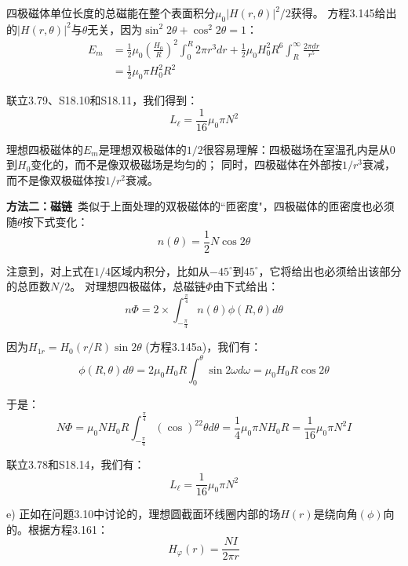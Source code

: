 四极磁体单位长度的总磁能在整个表面积分$\mu_0|H(r,\theta)|^2/2$获得。
方程3.145给出的$|H(r,\theta)|^2$与$\theta$无关，因为$\sin^2 2\theta+\cos^2 2\theta=1$：
\begin{align*}%
E_m&=\frac{1}{2}\mu_0(\frac{H_0}{R})^2\int_{0}^{R}2\pi r^3dr+\frac{1}{2}\mu_0H_{0}^{2}R^6\int_{R}^{\infty}\frac{2\pi dr}{r^5}\\
&=\frac{1}{2}\mu_0\pi H_{0}^{2}R^2\tag{S18.11}
\end{align*}

联立3.79、S18.10和S18.11，我们得到：
 \begin{equation*}%
L_\ell=\frac{1}{16}\mu_0\pi N^2 \tag{3.88}
\end{equation*}

理想四极磁体的$E_m$是理想双极磁体的$1/2$很容易理解：四极磁场在室温孔内是从$0$到$H_0$变化的，而不是像双极磁场是均匀的；
同时，四极磁体在外部按$1/r^3$衰减，而不是像双极磁体按$1/r^2$衰减。

\textbf{方法二：磁链}\ 类似于上面处理的双极磁体的``匝密度"，四极磁体的匝密度也必须随$\theta$按下式变化：
 \begin{equation*}%
n(\theta)=\frac{1}{2}N\cos 2\theta \tag{S18.12}
\end{equation*}

注意到，对上式在$1/4$区域内积分，比如从$-45^\circ$到$45^\circ$，它将给出也必须给出该部分的总匝数$N/2$。
对理想四极磁体，总磁链$\Phi$由下式给出：
\begin{equation*}%
n\Phi=2\times\int_{-\frac{\pi}{4}}^{\frac{\pi}{4}}n(\theta)\phi(R,\theta)d\theta \tag{S18.13b}
\end{equation*}

因为$H_{1r} = H_0(r/R) \sin 2\theta$ (方程3.145a)，我们有：
 \begin{equation*}%
\phi(R,\theta)d\theta=2\mu_0H_0R\int_{0}^{\theta}\sin 2\omega d\omega=\mu_0H_0R\cos 2\theta\tag{18.13b}
\end{equation*}

于是：
\begin{equation*}%
N\Phi=\mu_0NH_0R\int_{-\frac{\pi}{4}}^{\frac{\pi}{4}}(\cos)^22\theta d\theta
=\frac{1}{4}\mu_0\pi NH_0R=\frac{1}{16}\mu_0\pi N^2I \tag{S18.4}
\end{equation*}

联立3.78和S18.14，我们有：
 \begin{equation*}%
L_\ell=\frac{1}{16}\mu_0\pi N^2 \tag{3.88}
\end{equation*}

e) 正如在问题3.10中讨论的，理想圆截面环线圈内部的场$H(r)$是绕向角$(\phi)$向的。根据方程3.161：
 \begin{equation*}%
H_\varphi(r)=\frac{NI}{2\pi r} \tag{S18.15}
\end{equation*}

